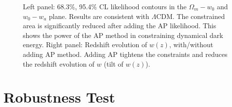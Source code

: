 \documentclass[useAMS,usenatbib]{mnras}
\begin{document}
\begin{figure}
   \caption{\label{fig_TpCF}
   Left panel: 68.3\%, 95.4\% CL likelihood contours in the $\Omega_m-w_0$ and $w_0-w_a$ plane.
   Results are consistent with $\Lambda$CDM.
   The constrained area is significantly reduced after adding the AP likelihood.
   This shows the power of the AP method in constraining dynamical dark energy.
   Right panel: Redshift evolution of $w(z)$, with/without adding AP method.
   Adding AP tightens the constraints and reduces the redshift evolution of $w$ (tilt of $w(z)$).
   }
\end{figure}


\section{Robustness Test}
\end{document}
